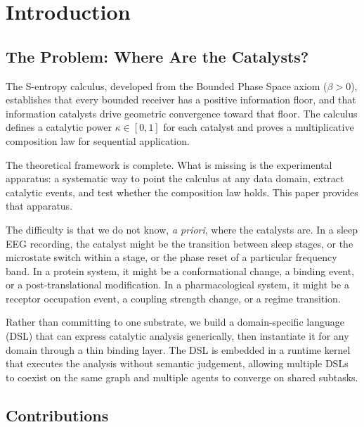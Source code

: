 \documentclass[11pt,a4paper]{article}
\theoremstyle{definition}
\theoremstyle{remark}
\begin{document}
\tableofcontents

\section{Introduction}
\label{sec:intro}

\subsection{The Problem: Where Are the Catalysts?}

The S-entropy calculus, developed from the Bounded Phase Space axiom ($\beta > 0$), establishes that every bounded receiver has a positive information floor, and that information catalysts drive geometric convergence toward that floor. The calculus defines a catalytic power $\kappa \in [0,1]$ for each catalyst and proves a multiplicative composition law for sequential application.

The theoretical framework is complete. What is missing is the experimental apparatus: a systematic way to point the calculus at any data domain, extract catalytic events, and test whether the composition law holds. This paper provides that apparatus.

The difficulty is that we do not know, \emph{a priori}, where the catalysts are. In a sleep EEG recording, the catalyst might be the transition between sleep stages, or the microstate switch within a stage, or the phase reset of a particular frequency band. In a protein system, it might be a conformational change, a binding event, or a post-translational modification. In a pharmacological system, it might be a receptor occupation event, a coupling strength change, or a regime transition.

Rather than committing to one substrate, we build a domain-specific language (DSL) that can express catalytic analysis generically, then instantiate it for any domain through a thin binding layer. The DSL is embedded in a runtime kernel that executes the analysis without semantic judgement, allowing multiple DSLs to coexist on the same graph and multiple agents to converge on shared subtasks.

\subsection{Contributions}
\end{document}
